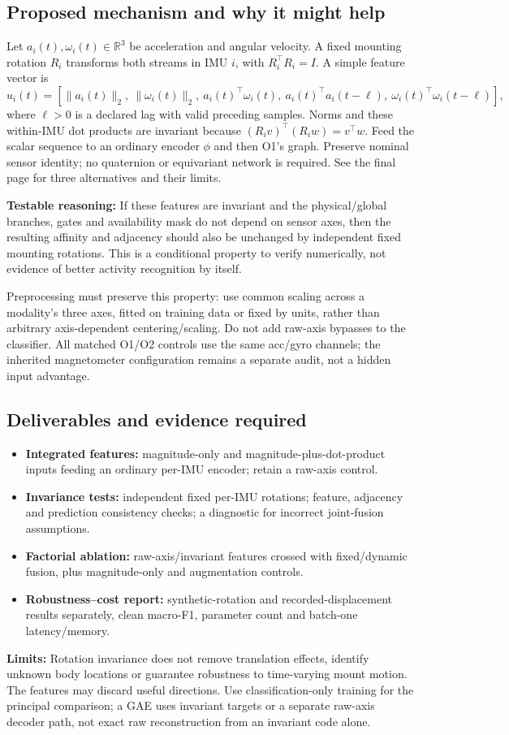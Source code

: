 \documentclass[10pt]{article}
\begin{document}
\subsection*{Proposed mechanism and why it might help}
Let $a_i(t),\omega_i(t)\in\mathbb{R}^3$ be acceleration and angular velocity. A fixed mounting rotation $R_i$ transforms both streams in IMU $i$, with $R_i^{\top}R_i=I$. A simple feature vector is
\[
u_i(t)=\left[\|a_i(t)\|_2,\ \|\omega_i(t)\|_2,\ a_i(t)^{\top}\omega_i(t),\
a_i(t)^{\top}a_i(t-\ell),\ \omega_i(t)^{\top}\omega_i(t-\ell)\right],
\]
where $\ell>0$ is a declared lag with valid preceding samples. Norms and these within-IMU dot products are invariant because $(R_iv)^{\top}(R_iw)=v^{\top}w$. Feed the scalar sequence to an ordinary encoder $\phi$ and then O1's graph. Preserve nominal sensor identity; no quaternion or equivariant network is required. See the final page for three alternatives and their limits.

\textbf{Testable reasoning:} If these features are invariant and the physical/global branches, gates and availability mask do not depend on sensor axes, then the resulting affinity and adjacency should also be unchanged by independent fixed mounting rotations. This is a conditional property to verify numerically, not evidence of better activity recognition by itself.

Preprocessing must preserve this property: use common scaling across a modality's three axes, fitted on training data or fixed by units, rather than arbitrary axis-dependent centering/scaling. Do not add raw-axis bypasses to the classifier. All matched O1/O2 controls use the same acc/gyro channels; the inherited magnetometer configuration remains a separate audit, not a hidden input advantage.

\subsection*{Deliverables and evidence required}
\begin{itemize}
\item \textbf{Integrated features:} magnitude-only and magnitude-plus-dot-product inputs feeding an ordinary per-IMU encoder; retain a raw-axis control.
\item \textbf{Invariance tests:} independent fixed per-IMU rotations; feature, adjacency and prediction consistency checks; a diagnostic for incorrect joint-fusion assumptions.
\item \textbf{Factorial ablation:} raw-axis/invariant features crossed with fixed/dynamic fusion, plus magnitude-only and augmentation controls.
\item \textbf{Robustness--cost report:} synthetic-rotation and recorded-displacement results separately, clean macro-F1, parameter count and batch-one latency/memory.
\end{itemize}
\textbf{Limits:} Rotation invariance does not remove translation effects, identify unknown body locations or guarantee robustness to time-varying mount motion. The features may discard useful directions. Use classification-only training for the principal comparison; a GAE uses invariant targets or a separate raw-axis decoder path, not exact raw reconstruction from an invariant code alone.
\end{document}
